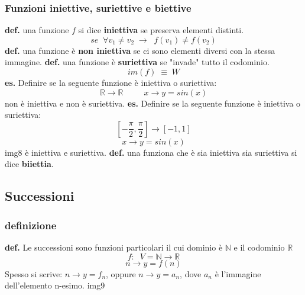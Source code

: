 \subsubsection*{Funzioni iniettive, suriettive e biettive}
\textbf{def.} una funzione $f$ si dice \textbf{iniettiva} se preserva elementi distinti.
\[
    se \;\; \forall v_1 \neq v_2 \;\rightarrow\;\; f(v_1) \neq f(v_2)
\]
\textbf{def.} una funzione è \textbf{non iniettiva} se ci sono elementi diversi con la stessa immagine.
\newline
\newline
\textbf{def.} una funzione è \textbf{suriettiva} se "invade" tutto il codominio.
\[
    im(f) \;\equiv\; W
\] 
\newline
\textbf{es.} Definire se la seguente funzione è iniettiva o suriettiva:
\[
    \mathbb{R} \rightarrow \mathbb{R} \;\;\;\;\;\;\;\;\; x \rightarrow y=sin(x)
\]
non è iniettiva e non è suriettiva.
\newline
\newline
\textbf{es.} Definire se la seguente funzione è iniettiva o suriettiva:
\[
    [-\frac{\pi}{2}, \frac{\pi}{2} ] \rightarrow [-1,1]
\]
\[
    x\rightarrow y=sin(x)
\]
img8
\newline
è iniettiva e suriettiva.
\newline
\newline
\newline
\textbf{def.} una funziona che è sia iniettiva sia suriettiva si dice \textbf{biiettia}.
\subsection*{Successioni}
\subsubsection*{definizione}
\textbf{def.} Le successioni sono funzioni particolari il cui dominio è $\mathbb{N}$ e il codominio $\mathbb{R}$
\[
    f:\;\; V = \mathbb{N} \rightarrow \mathbb{R}
\]
\[
    n \rightarrow y= f(n)
\]
Spesso si scrive: $n \rightarrow y= f_n$, oppure $n \rightarrow y= a_n$, dove $a_n$ è l'immagine dell'elemento n-esimo.
\newline
img9
